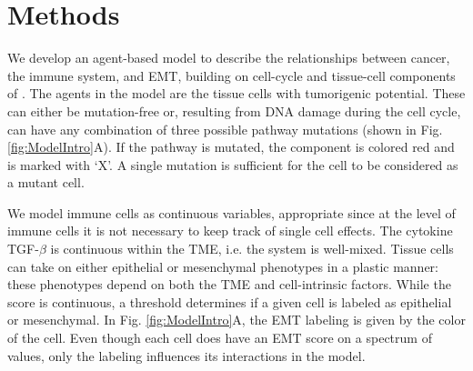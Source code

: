 \documentclass[11pt]{article}
\begin{document}
%











\section{Methods}
We develop an agent-based model to describe the relationships between cancer, the immune system, and EMT, building on cell-cycle and tissue-cell components of \cite{guo17_multiscale}. 
The agents in the model are the tissue cells with tumorigenic potential.
These can either be mutation-free or, resulting from DNA damage during the cell cycle, can have any combination of three possible pathway mutations (shown in Fig. \ref{fig:ModelIntro}A).
If the pathway is mutated, the component is colored red and is marked with `X'.
A single mutation is sufficient for the cell to be considered as a mutant cell.
\par
We model immune cells as continuous variables, appropriate since at the level of immune cells it is not necessary to keep track of single cell effects.
The cytokine TGF-$\beta$ is continuous within the TME, i.e. the system is well-mixed.
Tissue cells can take on either epithelial or mesenchymal phenotypes in a plastic manner: these phenotypes depend on both the TME and cell-intrinsic factors.
While the score is continuous, a threshold determines if a given cell is labeled as epithelial or mesenchymal.
In Fig. \ref{fig:ModelIntro}A, the EMT labeling is given by the color of the cell.
Even though each cell does have an EMT score on a spectrum of values, only the labeling influences its interactions in the model.
\end{document}
